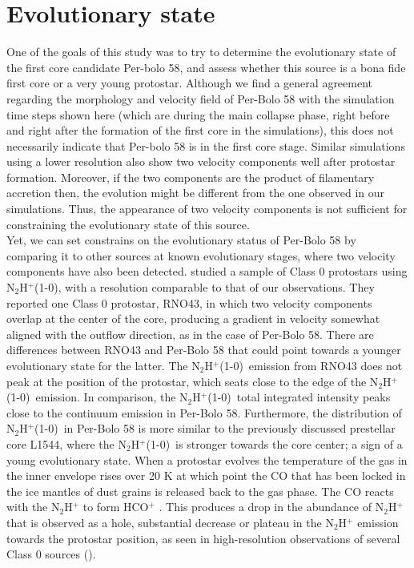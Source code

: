 \documentclass[iop]{emulateapj}
\newcommand{\nthp}{\mbox{\rm N$_2$H$^+$(1-0)}}
\begin{document}
\section{Evolutionary state}

One of the goals of this study was to try to determine the evolutionary state of the first core candidate Per-bolo 58, and assess whether this source is a bona fide first core or a very young protostar. Although we find a general agreement regarding the morphology and velocity field of Per-Bolo 58 with the simulation time steps shown here (which are during the main collapse phase, right before and right after the formation of the first core in the simulations), this does not necessarily indicate that Per-bolo 58 is in the first core stage. Similar simulations using a lower resolution also show two velocity components well after protostar formation. Moreover, if the two components are the product of filamentary accretion then, the evolution might be different from the one observed in our simulations. Thus, the appearance of two velocity components is not sufficient for constraining the evolutionary state of this source. \\

Yet, we can set constrains on the evolutionary status of Per-Bolo 58 by comparing it to other sources at known evolutionary stages, where two velocity components have also been detected. \cite{2011TobinComplex} studied a sample of Class 0 protostars using \nthp, with a resolution comparable to that of our observations. They reported one Class 0 protostar, RNO43, in which two velocity components overlap at the center of the core, producing a gradient in velocity somewhat aligned with the outflow direction, as in the case of Per-Bolo 58. There are differences between RNO43 and Per-Bolo 58 that could point towards a younger evolutionary state for the latter. The \nthp\ emission from RNO43 does not peak at the position of the protostar, which seats close to the edge of the \nthp\ emission. In comparison, the \nthp\ total integrated intensity peaks close to the continuum emission in Per-Bolo 58. Furthermore, the distribution of \nthp\ in Per-Bolo 58 is more similar to the previously discussed prestellar core L1544, where the \nthp\ is stronger towards the core center; a sign of a young evolutionary state. When a protostar evolves the temperature of the gas in the inner envelope rises over 20 K at which point the CO that has been locked in the ice mantles of dust grains is released back to the gas phase. The CO reacts with the N$_2$H$^+$ to form HCO$^+$ \citep{2004LeeEvolution}. This produces a drop in the abundance of N$_2$H$^+$ that is observed as a hole, substantial decrease or plateau in the N$_2$H$^+$ emission towards the protostar position, as seen in high-resolution observations of several Class 0 sources (\citealt{2011TobinComplex,2016AnderlProbing}).
\end{document}
